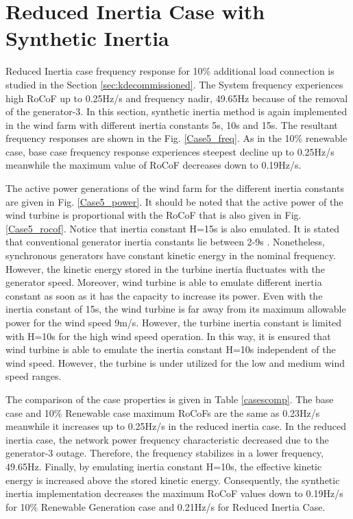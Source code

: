 \section{Reduced Inertia Case with Synthetic Inertia}
Reduced Inertia case frequency response for 10\% additional load connection is studied in the Section \ref{sec:kdecommissioned}. The System frequency experiences high RoCoF up to 0.25Hz/s and frequency nadir, 49.65Hz because of the removal of the generator-3. In this section, synthetic inertia method is again implemented in the wind farm with different inertia constants 5s, 10s and 15s. The resultant frequency responses are shown in the Fig. \ref{Case5_freq}. As in the 10\% renewable case, base case frequency response experiences steepest decline up to 0.25Hz/s meanwhile the maximum value of RoCoF decreases down to 0.19Hz/s. \par
The active power generations of the wind farm for the different inertia constants are given in Fig. \ref{Case5_power}. It should be noted that the active power of the wind turbine is proportional with the RoCoF that is also given in Fig. \ref{Case5_rocof}. Notice that inertia constant H=15s is also emulated. It is stated that conventional generator inertia constants lie between 2-9s \cite{Kundur}. Nonetheless, synchronous generators have constant kinetic energy in the nominal frequency. However, the kinetic energy stored in the turbine inertia fluctuates with the generator speed. Moreover, wind turbine is able to emulate different inertia constant as soon as it has the capacity to increase its power. Even with the inertia constant of 15s, the wind turbine is far away from its maximum allowable power for the wind speed 9m/s. However, the turbine inertia constant is limited with H=10s for the high wind speed operation. In this way, it is ensured that wind turbine is able to emulate the inertia constant H=10s independent of the wind speed. However, the turbine is under utilized for the low and medium wind speed ranges.\par
The comparison of the case properties is given in Table \ref{casescomp}. The base case and 10\% Renewable case maximum RoCoFs are the same as 0.23Hz/s meanwhile it increases up to 0.25Hz/s in the reduced inertia case. In the reduced inertia case, the network power frequency characteristic decreased due to the generator-3 outage. Therefore, the frequency stabilizes in a lower frequency, 49.65Hz. Finally, by emulating inertia constant H=10s, the effective kinetic energy is increased above the stored kinetic energy. Consequently, the synthetic inertia implementation decreases the maximum RoCoF values down to 0.19Hz/s for 10\% Renewable Generation case and 0.21Hz/s for Reduced Inertia Case.
